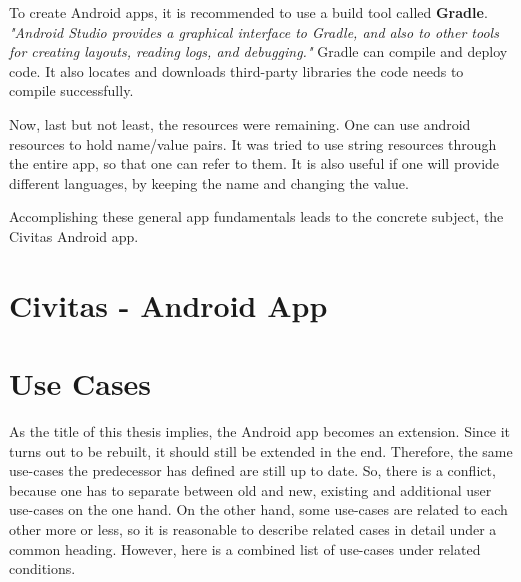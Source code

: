 To create Android apps, it is recommended to use a build tool called \textbf{Gradle}. \textit{"Android Studio provides a graphical interface to Gradle, and also to other tools for creating layouts, reading logs, and debugging."} \citep[p. 7]{Griffiths:2017} Gradle can compile and deploy code. It also locates and downloads third-party libraries the code needs to compile successfully. 

Now, last but not least, the resources were remaining. One can use android resources to hold name/value pairs. It was tried to use string resources through the entire app, so that one can refer to them. It is also useful if one will provide different languages, by keeping the name and changing the value.

Accomplishing these general app fundamentals leads to the concrete subject, the Civitas Android app.
 
\section{Civitas - Android App}

\section{Use Cases}
\label{design:subsection:use_cases}
As the title of this thesis implies, the Android app becomes an extension. Since it turns out to be rebuilt, it should still be extended in the end. Therefore, the same use-cases the predecessor has defined are still up to date. \citep[cf. p. 24]{Ganapijev18}
So, there is a conflict, because one has to separate between old and new, existing and additional user use-cases on the one hand. On the other hand, some use-cases are related to each other more or less, so it is reasonable to describe related cases in detail under a common heading. However, here is a combined list of use-cases under related conditions.

